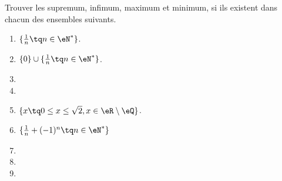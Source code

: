 

\begin{exercice}\label{exoINGE1114-0008}

	Trouver les supremum, infimum, maximum et minimum, si ils existent dans chacun des ensembles suivants.
	\begin{enumerate}

		\item
			$\{ \frac{1}{ n }\tq n\in\eN^* \}$.
		\item
			$\{ 0 \}\cup\{ \frac{1}{ n }\tq n\in\eN^* \}$.
		\item
		\item
		\item
			$\{ x\tq 0\leq x\leq\sqrt{2}, x\in\eR\setminus\eQ \}$.
		\item
			$\{ \frac{1}{ n }+(-1)^n\tq n\in\eN^* \}$
		\item
		\item
		\item

	\end{enumerate}

\end{exercice}
